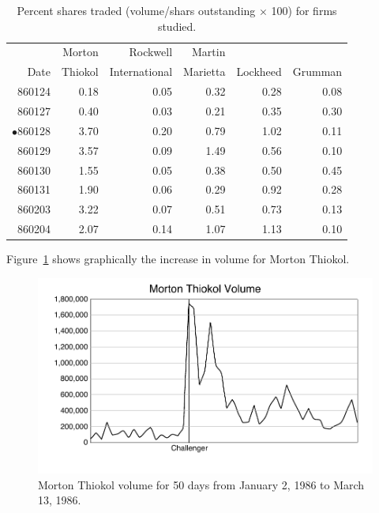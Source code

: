 \begin{table}[h!]
\caption{Percent shares traded (volume/shars outstanding
$\times$ 100) for firms studied.}
\sffamily
\begin{tabular*}{6in}{r@{\extracolsep{1em}}rrrrr}
\hline\hline       
       &  Morton & Rockwell & Martin &          &         \\
Date   &  Thiokol & International & Marietta & Lockheed & Grumman \\
\hline
860124 &   0.18 &   0.05 &   0.32 &   0.28 &   0.08  \\
860127 &   0.40 &   0.03 &   0.21 &   0.35 &   0.30  \\
$\bullet$860128 &   3.70 &   0.20 &   0.79 &   1.02 &   0.11  \\
860129 &   3.57 &   0.09 &   1.49 &   0.56 &   0.10  \\
860130 &   1.55 &   0.05 &   0.38 &   0.50 &   0.45  \\
860131 &   1.90 &   0.06 &   0.29 &   0.92 &   0.28  \\
860203 &   3.22 &   0.07 &   0.51 &   0.73 &   0.13  \\
860204 &   2.07 &   0.14 &   1.07 &   1.13 &   0.10  \\ \hline
\end{tabular*}
\label{percenttraded}
\end{table}

Figure~\ref{thvol} shows graphically the increase in volume
for Morton Thiokol.

\begin{figure}[hp]
\begin{center}
%
\includegraphics{thvol-final}
\end{center}
\caption{Morton Thiokol volume for 50 days from January 2,
1986 to March 13, 1986.}
\label{thvol}
\end{figure}


